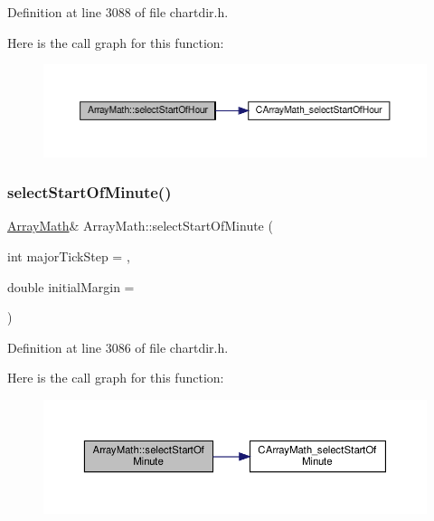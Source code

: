 Definition at line 3088 of file chartdir.\+h.

Here is the call graph for this function\+:
\nopagebreak
\begin{figure}[H]
\begin{center}
\leavevmode
\includegraphics[width=350pt]{class_array_math_a39fc6c03bb738f82e4f98daebb672dda_cgraph}
\end{center}
\end{figure}
\mbox{\label{class_array_math_a56f6e1b492180694a2117d030858a41a}} 
\subsubsection{\texorpdfstring{select\+Start\+Of\+Minute()}{selectStartOfMinute()}}
{\footnotesize\ttfamily \hyperlink{class_array_math}{Array\+Math}\& Array\+Math\+::select\+Start\+Of\+Minute (\begin{DoxyParamCaption}\item[{int}]{major\+Tick\+Step = {},  }\item[{double}]{initial\+Margin = {} }\end{DoxyParamCaption})\hspace{0.3cm}{\ttfamily [inline]}}



Definition at line 3086 of file chartdir.\+h.

Here is the call graph for this function\+:
\nopagebreak
\begin{figure}[H]
\begin{center}
\leavevmode
\includegraphics[width=350pt]{class_array_math_a56f6e1b492180694a2117d030858a41a_cgraph}
\end{center}
\end{figure}
\mbox{\label{class_array_math_a65c725e8229a4cba8072af77b23e2286}} 
